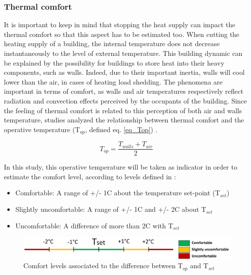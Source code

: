 \documentclass[buildings,article,submit,moreauthors,pdftex,10pt,a4paper]{mdpi}
\theoremstyle{mdpi}
\newcounter{ex}
\newcounter{re}
\theoremstyle{mdpidefinition}
\begin{document}
\subsubsection{Thermal comfort}
It is important to keep in mind that stopping the heat supply can impact the thermal comfort so that this aspect has to be estimated too. When cutting the heating supply of a building, the internal temperature does not decrease instantaneously to the level of external temperature. This building dynamic can be explained by the possibility for buildings to store heat into their heavy components, such as walls. Indeed, due to their important inertia, walls will cool lower than the air, in cases of heating load shedding. The phenomena are important in terms of comfort, as walls and air temperatures respectively reflect radiation and convection effects perceived by the occupants of the building. Since the feeling of thermal comfort is related to this perception of both air and walls temperature, studies analyzed the relationship between thermal comfort and the operative temperature (T$_{op}$, defined eq. \ref{eq_Top}) \cite{de_dear_developing_1998}.

\begin{equation}
	\label{eq_Top}
	T_{op} = \frac{T_{walls} + T_{air}}{2}
\end{equation}

In this study, this operative temperature will be taken as indicator in order to estimate the comfort level, according to levels defined in \cite{faria_neto_thermal_2016}:

\begin{itemize}[leftmargin=*,labelsep=4mm]
	\item Comfortable: A range of +/- 1\textdegree{}C about the temperature set-point (T$_{set}$)
	\item Slightly uncomfortable: A range of +/- 1\textdegree{}C and +/- 2\textdegree{}C about T$_{set}$
	\item Uncomfortable: A difference of more than 2\textdegree{}C with T$_{set}$
\end{itemize}

\begin{figure}[H]
    \centering
    \includegraphics[scale=0.4]{Temperature_comfort.jpg}
    \caption{Comfort levels associated to the difference between T$_{op}$ and T$_{set}$}
    \label{temp_comfort}
\end{figure}
\end{document}
